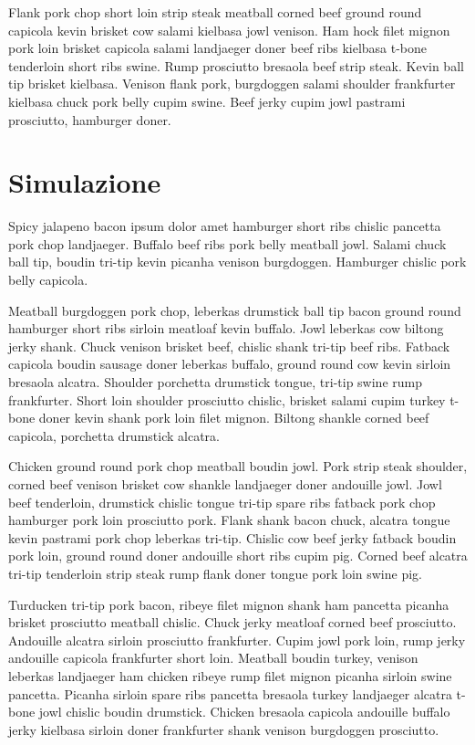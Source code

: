 \documentclass[a4paper]{article}
\begin{document}
Flank pork chop short loin strip steak meatball corned beef ground round capicola kevin brisket cow salami kielbasa jowl venison. Ham hock filet mignon pork loin brisket capicola salami landjaeger doner beef ribs kielbasa t-bone tenderloin short ribs swine. Rump prosciutto bresaola beef strip steak. Kevin ball tip brisket kielbasa. Venison flank pork, burgdoggen salami shoulder frankfurter kielbasa chuck pork belly cupim swine. Beef jerky cupim jowl pastrami prosciutto, hamburger doner.

\section{Simulazione}

Spicy jalapeno bacon ipsum dolor amet hamburger short ribs chislic pancetta pork chop landjaeger. Buffalo beef ribs pork belly meatball jowl. Salami chuck ball tip, boudin tri-tip kevin picanha venison burgdoggen. Hamburger chislic pork belly capicola.

Meatball burgdoggen pork chop, leberkas drumstick ball tip bacon ground round hamburger short ribs sirloin meatloaf kevin buffalo. Jowl leberkas cow biltong jerky shank. Chuck venison brisket beef, chislic shank tri-tip beef ribs. Fatback capicola boudin sausage doner leberkas buffalo, ground round cow kevin sirloin bresaola alcatra. Shoulder porchetta drumstick tongue, tri-tip swine rump frankfurter. Short loin shoulder prosciutto chislic, brisket salami cupim turkey t-bone doner kevin shank pork loin filet mignon. Biltong shankle corned beef capicola, porchetta drumstick alcatra.

Chicken ground round pork chop meatball boudin jowl. Pork strip steak shoulder, corned beef venison brisket cow shankle landjaeger doner andouille jowl. Jowl beef tenderloin, drumstick chislic tongue tri-tip spare ribs fatback pork chop hamburger pork loin prosciutto pork. Flank shank bacon chuck, alcatra tongue kevin pastrami pork chop leberkas tri-tip. Chislic cow beef jerky fatback boudin pork loin, ground round doner andouille short ribs cupim pig. Corned beef alcatra tri-tip tenderloin strip steak rump flank doner tongue pork loin swine pig.

Turducken tri-tip pork bacon, ribeye filet mignon shank ham pancetta picanha brisket prosciutto meatball chislic. Chuck jerky meatloaf corned beef prosciutto. Andouille alcatra sirloin prosciutto frankfurter. Cupim jowl pork loin, rump jerky andouille capicola frankfurter short loin. Meatball boudin turkey, venison leberkas landjaeger ham chicken ribeye rump filet mignon picanha sirloin swine pancetta. Picanha sirloin spare ribs pancetta bresaola turkey landjaeger alcatra t-bone jowl chislic boudin drumstick. Chicken bresaola capicola andouille buffalo jerky kielbasa sirloin doner frankfurter shank venison burgdoggen prosciutto.
\end{document}
